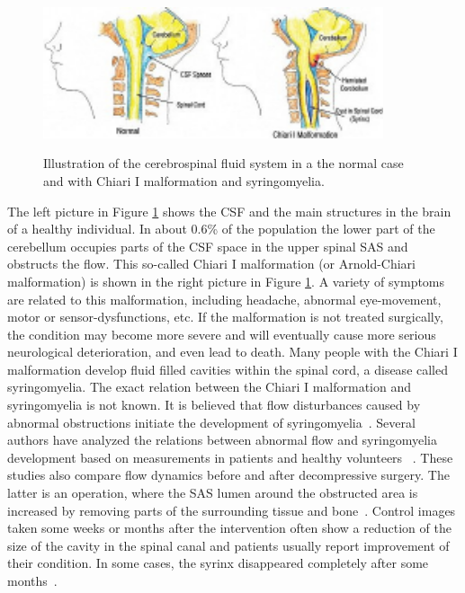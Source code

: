 \begin{figure}\begin{center}
\includegraphics[width=100mm]{chapters/hentschel/pdf/chiara_about.pdf}
\caption{Illustration of the cerebrospinal fluid system in a the normal case and with Chiari I malformation and syringomyelia.}
\label{fig:anatomy}
\end{center}\end{figure}

The left picture in Figure \ref{fig:anatomy} shows the CSF and the
main structures in the brain of a healthy individual. In about 0.6\%
of the population the lower part of the cerebellum occupies parts of
the CSF space in the upper spinal SAS and obstructs the flow. This
so-called Chiari I malformation  (or
Arnold-Chiari malformation) is
shown in the right picture in Figure \ref{fig:anatomy}. A variety of
symptoms are related to this malformation, including headache, abnormal
eye-movement, motor or sensor-dysfunctions, etc. If the malformation
is not treated surgically, the condition may become more severe and
will eventually cause more serious neurological deterioration, and even
lead to death. Many people with the Chiari I malformation develop
fluid filled cavities within the spinal cord,  a
disease called syringomyelia. The exact
relation between the Chiari I malformation and syringomyelia is
 not known. It is believed that flow disturbances caused by abnormal obstructions initiate the development of
syringomyelia~\cite{OldfieldMuraszkoShawkerEtAl1994}. Several authors have
analyzed the relations between abnormal flow and syringomyelia
development based on measurements in patients and healthy volunteers
~\cite{HeissPatronasDeVroomEtAl1999,Pinna2000,Hofmann2000,Haughton2003}. These studies also compare flow dynamics before and after decompressive
surgery. The latter is an operation, where the SAS lumen around the
obstructed area is increased by removing parts of the surrounding
tissue and bone~\cite{MilhoratBolognese2003}. Control
images taken some weeks or months after the intervention often show a
reduction of the size of the cavity in the spinal canal and patients
usually report improvement of their condition. In some cases, the
syrinx disappeared completely after some months~\cite{OldfieldMuraszkoShawkerEtAl1994,Pinna2000,Heiss1999}.

